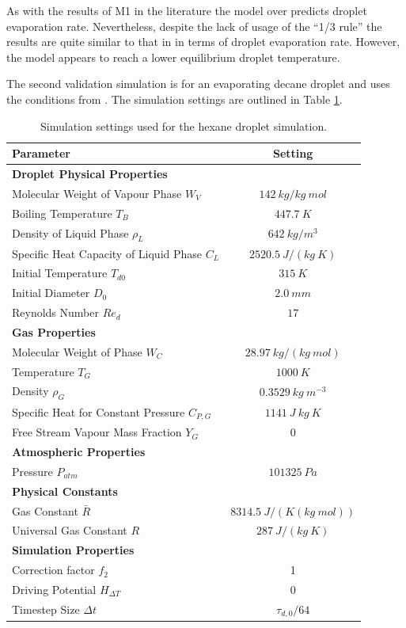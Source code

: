 \documentclass[../Interim_Report_Master]{subfiles}
\begin{document}
As with the results of M1 in the literature the model over predicts droplet evaporation rate. Nevertheless, despite the lack of usage of the ``1/3 rule'' the results are quite similar to that in \cite{Miller1998} in terms of droplet evaporation rate. However, the model appears to reach a lower equilibrium droplet temperature.

The second validation simulation is for an evaporating decane droplet and uses the conditions from \cite{wong1992}. The simulation settings are outlined in Table \ref{tab:sim_set_dec}.
\begin{table}[H]
	\centering
	\begin{tabular}{|l c|}
		\hline
		\textbf{Parameter} & \textbf{Setting} \\ \hline
		\textbf{Droplet Physical Properties} &  \\ 
		Molecular Weight of Vapour Phase $W_V$ & $142~kg/kg~mol$ \\ 
		Boiling Temperature $T_B$ & $447.7~K$ \\ 
		Density of Liquid Phase $\rho_L$ & $642~kg/m^3$ \\
		Specific Heat Capacity of Liquid Phase $C_L$ & $2520.5~J/(kg~K)$ \\ 
		Initial Temperature $T_{d0}$ & $315~K$ \\ 
		Initial Diameter $D_0$ & $2.0~mm$ \\ 
		Reynolds Number $Re_d$ & $17$ \\ \hline
		\textbf{Gas Properties} &  \\ 
		Molecular Weight of Phase $W_C$ & $28.97~kg/(kg~mol)$ \\ 
		Temperature $T_G$ & $1000~K$ \\
		Density $\rho_G$ & $0.3529~kg~m^{-3}$ \\ 
		Specific Heat for Constant Pressure $C_{P,G}$ & $1141~J~kg~K$ \\
		Free Stream Vapour Mass Fraction $Y_G$ & $0$ \\ \hline
		\textbf{Atmospheric Properties} &  \\ 
		Pressure $P_{atm}$ & $101325~Pa$ \\ \hline
		\textbf{Physical Constants} &  \\ 
		Gas Constant $\bar{R}$ & $8314.5~J/(K(kg~mol))$ \\ 
		Universal Gas Constant $R$ & $287~J/(kg~K)$ \\ \hline
		\textbf{Simulation Properties} &  \\ 
		Correction factor $f_2$ & 1 \\
		Driving Potential $H_{\Delta T}$ & 0 \\
		Timestep Size $\Delta t$ & $\tau_{d,0}/64$ \\ \hline
	\end{tabular}
	\caption{Simulation settings used for the hexane droplet simulation.}
	\label{tab:sim_set_dec}
\end{table}
\end{document}

